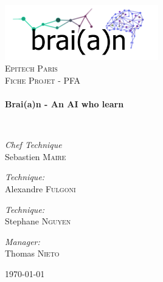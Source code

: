 \begin{titlepage}
  \begin{center}

    \includegraphics[width=0.5\textwidth]{braian}~\\[1cm]

    \textsc{\LARGE Epitech Paris}\\[1.5cm]

    \textsc{\Large Fiche Projet - PFA}\\[0.5cm]

    \HRule \\[0.4cm]
    { \huge \bfseries Brai(a)n - An AI who learn \\[0.4cm] }

    \HRule \\[1.5cm]

    \noindent

    \begin{flushleft} \large
      \emph{Chef Technique}\\
      Sebastien \textsc{Maire}
    \end{flushleft}

    \begin{flushright} \large
      \emph{Technique:} \\
      Alexandre \textsc{Fulgoni}
    \end{flushright}

    \begin{flushleft} \large
      \emph{Technique:} \\
      Stephane \textsc{Nguyen}
    \end{flushleft}

    \begin{flushright} \large
      \emph{Manager:} \\
      Thomas \textsc{Nieto}
    \end{flushright}

    \vfill

    {\large \today}

  \end{center}

\end{titlepage}

